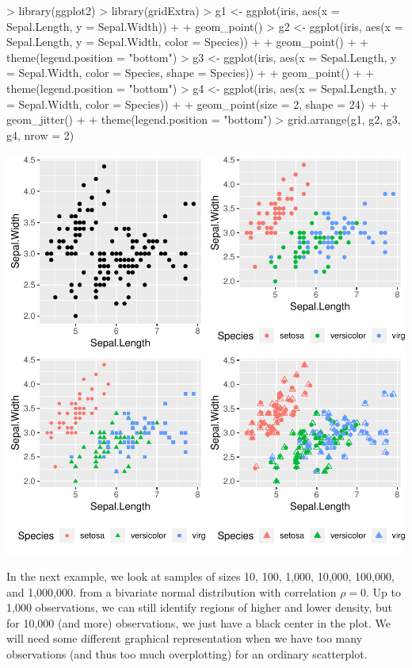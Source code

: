 \documentclass[12pt,letterpaper,final]{article}
\begin{document}
\begin{Schunk}
\begin{Sinput}
> library(ggplot2)
> library(gridExtra)
> g1 <- ggplot(iris, aes(x = Sepal.Length, y = Sepal.Width)) + 
+   geom_point()
> g2 <- ggplot(iris, aes(x = Sepal.Length, y = Sepal.Width, color = Species)) + 
+   geom_point() + 
+   theme(legend.position = "bottom")
> g3 <- ggplot(iris, aes(x = Sepal.Length, y = Sepal.Width, color = Species, shape = Species)) + 
+   geom_point() + 
+   theme(legend.position = "bottom")
> g4 <- ggplot(iris, aes(x = Sepal.Length, y = Sepal.Width, color = Species)) + 
+   geom_point(size = 2, shape = 24) + 
+   geom_jitter() +
+   theme(legend.position = "bottom")
> grid.arrange(g1, g2, g3, g4, nrow = 2)
\end{Sinput}
\end{Schunk}
\includegraphics{lect_main-002}


\newpage


In the next example, we look at samples of sizes 
10, 100, 1,000, 10,000, 100,000, and 1,000,000.
from a bivariate normal distribution with correlation $\rho = 0$.
Up to 1,000 observations, we can still identify regions of higher and lower
density, but for 10,000 (and more) observations, we just have a black center in the plot.
We will need some different graphical representation when we have too many
observations (and thus too much overplotting) for an ordinary scatterplot.
\end{document}
